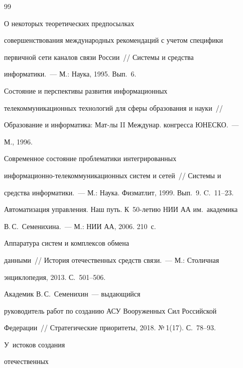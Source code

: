 {{\begin{thebibliography}{99}

 О некоторых теоретических предпосылках 

совершенствования международных рекомендаций с учетом специфики 

первичной сети каналов связи России~/\!\!/ Системы и средства 

информатики.~---  М.: Наука, 1995. Вып.~6. 


 Состояние и перспективы развития информационных 

телекоммуникационных технологий для сферы образования и науки~/\!\!/ 

Образование и информатика: Мат-лы II Междунар. конгресса ЮНЕСКО.~--- 

М., 1996.


 Современное состояние проблематики интегрированных 

ин\-фор\-ма\-ци\-он\-но-телекоммуникационных систем и сетей~/\!\!/ Системы и 

средства информатики.~--- М.: Наука. Физматлит, 1999. Вып.~9. C.~11--23. 




Автоматизация управления. Наш путь. К~50-летию НИИ АА им.\ академика 

В.\,С.~Семенихина.~--- М.: НИИ АА, 2006. 210~с.


 Аппаратура систем и комплексов обмена 

данными~/\!\!/ История отечественных средств связи.~--- М.: Столичная 

энциклопедия, 2013. С.~501--506.




 Академик В.\,С.~Семенихин~--- выдающийся 

руководитель работ по созданию АСУ Вооруженных Сил Российской 

Федерации~/\!\!/ Стратегические приоритеты, 2018. №\,1(17). С.~78--93.




 У~истоков создания 

отечественных  


\end{thebibliography}}}
